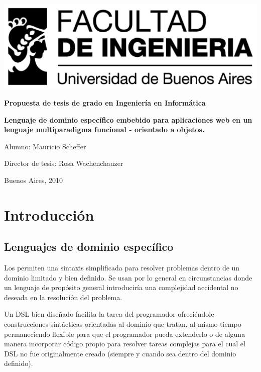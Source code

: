 \documentclass[12pt]{article}
\begin{document}
\thispagestyle{empty}

\begin {center}

\includegraphics[scale=1]{logo_fiuba_alta.jpg}


\vspace{3cm}

\textbf{\large Propuesta de tesis de grado en Ingeniería en Informática}

\vspace{3cm}

\textbf{\large Lenguaje de dominio específico embebido para aplicaciones web en un lenguaje multiparadigma funcional - orientado a objetos.}

\vspace{2cm}

\end {center}
\vspace{3cm}

Alumno: Mauricio Scheffer

Director de tesis: Rosa Wachenchauzer

Buenos Aires, 2010

\newpage

\section{Introducción}

\subsection{Lenguajes de dominio específico}

Los  permiten una sintaxis simplificada para resolver problemas dentro de un dominio limitado y bien definido. Se usan por lo general en circunstancias donde un lenguaje de propósito general introduciría una complejidad accidental no deseada en la resolución del problema. 

Un DSL bien diseñado facilita la tarea del programador ofreciéndole construcciones sintácticas orientadas al dominio que tratan, al mismo tiempo permaneciendo flexible para que el programador pueda extenderlo o de alguna manera incorporar código propio para resolver tareas complejas para el cual el DSL no fue originalmente creado (siempre y cuando sea dentro del dominio definido).
\end{document}
